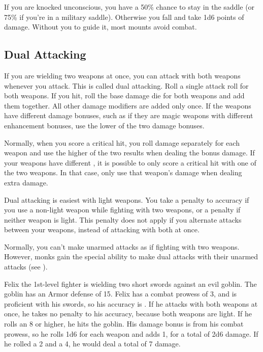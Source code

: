          If you are knocked unconscious, you have a 50\% chance to stay in the saddle (or 75\% if you're in a military saddle). Otherwise you fall and take 1d6 points of damage. Without you to guide it, most mounts avoid combat.

    \subsection{Dual Attacking}\label{Dual Attacking}
        If you are wielding two weapons at once, you can attack with both weapons whenever you attack. This is called dual attacking. Roll a single attack roll for both weapons. If you hit, roll the base damage die for both weapons and add them together. All other damage modifiers are added only once. If the weapons have different damage bonuses, such as if they are magic weapons with different enhancement bonuses, use the lower of the two damage bonuses.

         Normally, when you score a critical hit, you roll damage separately for each weapon and use the higher of the two results when dealing the bonus damage. If your weapons have different , it is possible to only score a critical hit with one of the two weapons. In that case, only use that weapon's damage when dealing extra damage.

         Dual attacking is easiest with light weapons. You take a  penalty to accuracy if you use a non-light weapon while fighting with two weapons, or a  penalty if neither weapon is light. This penalty does not apply if you alternate attacks between your weapons, instead of attacking with both at once.

         Normally, you can't make unarmed attacks as if fighting with two weapons. However, monks gain the special ability to make dual attacks with their unarmed attacks (see ).

         Felix the 1st-level fighter is wielding two short swords against an evil goblin. The goblin has an Armor defense of 15. Felix has a combat prowess of 3, and is proficient with his swords, so his accuracy is . If he attacks with both weapons at once, he takes no penalty to his accuracy, because both weapons are light. If he rolls an 8 or higher, he hits the goblin. His damage bonus is  from his combat prowess, so he rolls 1d6 for each weapon and adds 1, for a total of 2d6 damage. If he rolled a 2 and a 4, he would deal a total of 7 damage.
